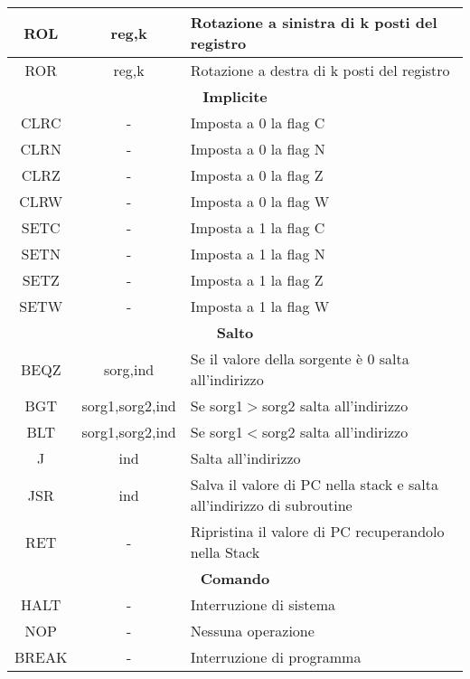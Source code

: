 \documentclass{article}
\begin{document}
\begin{table}[H]
\begin{adjustwidth}{-2.7cm}{}
\begin{tabular}{|c|c|l|}
    \hline
        ROL & reg,k & Rotazione a sinistra di k posti del registro \\
    \hline
        ROR & reg,k & Rotazione a destra di k posti del registro \\
    \hline
        \multicolumn{3}{|c|}{\textbf{Implicite}}\\
    \hline
        CLRC & - & Imposta a 0 la flag C \\
    \hline
        CLRN & - & Imposta a 0 la flag N \\
    \hline
        CLRZ & - & Imposta a 0 la flag Z \\
    \hline
        CLRW & - & Imposta a 0 la flag W \\
    \hline
        SETC & - & Imposta a 1 la flag C \\
    \hline
        SETN & - & Imposta a 1 la flag N \\
    \hline
        SETZ & - & Imposta a 1 la flag Z \\
    \hline
        SETW & - & Imposta a 1 la flag W \\
    \hline
        \multicolumn{3}{|c|}{\textbf{Salto}}\\
    \hline
        BEQZ & sorg,ind & Se il valore della sorgente è 0 salta all'indirizzo \\
    \hline
        BGT & sorg1,sorg2,ind & Se sorg1$>$sorg2 salta all'indirizzo \\
    \hline
        BLT & sorg1,sorg2,ind & Se sorg1$<$sorg2 salta all'indirizzo \\
    \hline
        J & ind & Salta all'indirizzo \\
    \hline
        JSR & ind & Salva il valore di PC nella stack e salta all'indirizzo di subroutine \\
    \hline
        RET & - & Ripristina il valore di PC recuperandolo nella Stack\\
    \hline
        \multicolumn{3}{|c|}{\textbf{Comando}}\\
    \hline
        HALT & - & Interruzione di sistema\\
    \hline
        NOP & - & Nessuna operazione\\
    \hline
        BREAK & - & Interruzione di programma\\
    \hline
        
    \end{tabular}
\end{adjustwidth}
\label{tab:istr}
\end{table}
\end{document}
